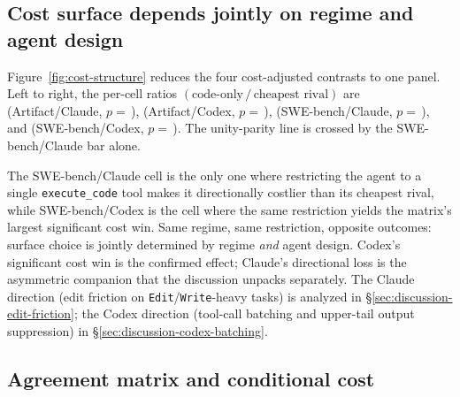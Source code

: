 \subsection{Cost surface depends jointly on regime and agent design}
\label{sec:results-structure}

Figure~\ref{fig:cost-structure} reduces the four cost-adjusted contrasts
to one panel. Left to right, the per-cell ratios
$(\text{code-only}\,/\,\text{cheapest rival})$ are
(Artifact/Claude, $p=$\,),
(Artifact/Codex, $p=$\,),
(SWE-bench/Claude, $p=$\,), and
(SWE-bench/Codex, $p=$\,).
The unity-parity line is crossed by the SWE-bench/Claude bar alone.

The SWE-bench/Claude cell is the only one where restricting the agent
to a single \texttt{execute\_code} tool makes it directionally costlier
than its cheapest rival, while SWE-bench/Codex is the cell where the same
restriction yields the matrix's largest significant cost win. Same
regime, same restriction, opposite outcomes: surface choice is jointly
determined by regime \emph{and} agent design. Codex's significant cost
win is the confirmed effect; Claude's directional loss is the
asymmetric companion that the discussion unpacks separately. The
Claude direction (edit friction on \texttt{Edit}/\texttt{Write}-heavy
tasks) is analyzed in \S\ref{sec:discussion-edit-friction}; the Codex
direction (tool-call batching and upper-tail output suppression) in
\S\ref{sec:discussion-codex-batching}.


\subsection{Agreement matrix and conditional cost}
\label{sec:results-agreement}

